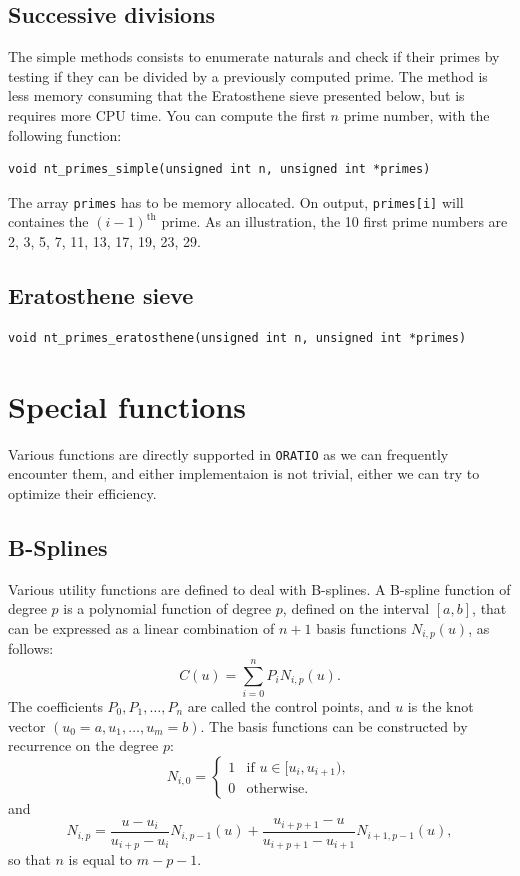 \subsection{Successive divisions}

The simple methods consists to enumerate naturals and check if their
primes by testing if they can be divided by a previously computed
prime.
The method is less memory consuming that the Eratosthene sieve
presented below, but is requires more CPU time.
You can compute the first $n$ prime number, with the following function:
\begin{verbatim}
void nt_primes_simple(unsigned int n, unsigned int *primes)
\end{verbatim}
The array \verb|primes| has to be memory allocated.
On output, \verb|primes[i]| will containes the $(i-1)^{\mbox{th}}$
prime.
As an illustration, the 10 first prime numbers are 2, 3, 5, 7, 11, 13,
17, 19, 23, 29.

\subsection{Eratosthene sieve}

\begin{verbatim}
void nt_primes_eratosthene(unsigned int n, unsigned int *primes)
\end{verbatim}

\section{Special functions}

Various functions are directly supported in \texttt{ORATIO} as we can
frequently encounter them, and either implementaion is not trivial,
either we can try to optimize their efficiency.

\subsection{B-Splines}

Various utility functions are defined to deal with B-splines.
A B-spline function of degree $p$ is a polynomial function of degree
$p$, defined on the interval $[a, b]$, that can be expressed as a linear
combination of $n+1$ basis functions $N_{i,p}(u)$, as follows:
\begin{equation}
C(u) = \sum_{i=0}^n P_i N_{i,p}(u) .
\label{eq:spline_expression}
\end{equation}
The coefficients $P_0, P_1, \ldots, P_n$ are called the control
points, and $u$ is the knot vector $(u_0 = a, u_1, \ldots, u_m
=b)$.
The basis functions can be constructed by recurrence on the degree $p$:
\[
N_{i, 0} =
\begin{cases}
1 & \mbox{if } u \in [u_i, u_{i+1}), \\
0 & \mbox{otherwise.}
\end{cases}
\]
and
\[
N_{i,p} = \frac{u-u_i}{u_{i+p}-u_i} N_{i, p-1}(u) +
\frac{u_{i+p+1}-u}{u_{i+p+1}-u_{i+1}} N_{i+1, p-1}(u),
\]
so that $n$ is equal to $m-p-1$.

